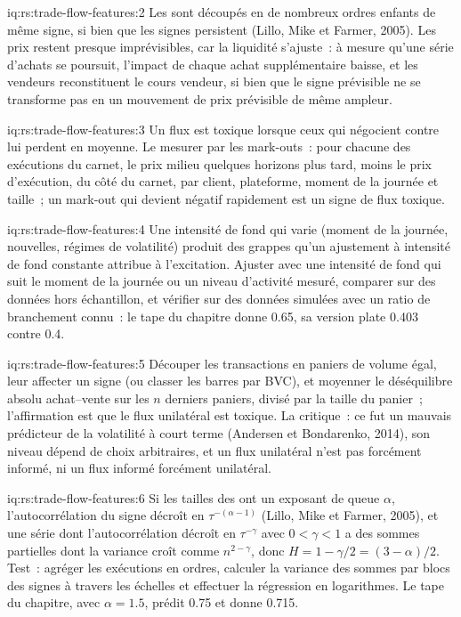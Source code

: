 \begin{solution}{iq:rs:trade-flow-features:2}
Les  sont découpés en de nombreux ordres enfants de même signe, si bien que les signes persistent (Lillo, Mike et Farmer, 2005). Les prix restent presque
imprévisibles, car la liquidité s'ajuste~: à mesure qu'une série d'achats se poursuit, l'impact de chaque achat supplémentaire baisse, et les vendeurs reconstituent le cours vendeur, si bien que le signe prévisible
ne se transforme pas en un mouvement de prix prévisible de même ampleur.
\end{solution}

\begin{solution}{iq:rs:trade-flow-features:3}
Un flux est toxique lorsque ceux qui négocient contre lui perdent en moyenne. Le mesurer par les mark-outs~: pour chacune des exécutions du carnet, le prix milieu quelques horizons
plus tard, moins le prix d'exécution, du côté du carnet, par client, plateforme, moment de la journée et taille~; un mark-out qui devient négatif rapidement est un signe de
flux toxique.
\end{solution}

\begin{solution}{iq:rs:trade-flow-features:4}
Une intensité de fond qui varie (moment de la journée, nouvelles, régimes de volatilité) produit des grappes qu'un ajustement à intensité de fond constante attribue à l'excitation. Ajuster
avec une intensité de fond qui suit le moment de la journée ou un niveau d'activité mesuré, comparer sur des données hors échantillon, et vérifier sur des données simulées avec un
ratio de branchement connu~: le tape du chapitre donne 0.65, sa version plate 0.403 contre 0.4.
\end{solution}

\begin{solution}{iq:rs:trade-flow-features:5}
Découper les transactions en paniers de volume égal, leur affecter un signe (ou classer les barres par BVC), et moyenner le déséquilibre absolu achat--vente sur les $n$
derniers paniers, divisé par la taille du panier~; l'affirmation est que le flux unilatéral est toxique. La critique~: ce fut un mauvais prédicteur de la volatilité à court terme
(Andersen et Bondarenko, 2014), son niveau dépend de choix arbitraires, et un flux unilatéral n'est pas forcément informé, ni un flux informé
forcément unilatéral.
\end{solution}

\begin{solution}{iq:rs:trade-flow-features:6}
Si les tailles des  ont un exposant de queue $\alpha$, l'autocorrélation du signe décroît en $\tau^{-(\alpha-1)}$ (Lillo, Mike et Farmer, 2005), et une
série dont l'autocorrélation décroît en $\tau^{-\gamma}$ avec $0 < \gamma < 1$ a des sommes partielles dont la variance croît comme $n^{2 - \gamma}$,
donc $H = 1 - \gamma/2 = (3 - \alpha)/2$. Test~: agréger les exécutions en ordres, calculer la variance des sommes par blocs des signes à travers les échelles
et effectuer la régression en logarithmes. Le tape du chapitre, avec $\alpha = 1.5$, prédit 0.75 et donne 0.715.
\end{solution}

